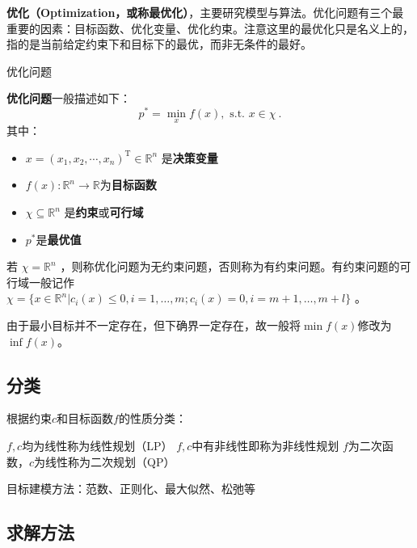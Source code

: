 
\begin{issues}
\issueDraft
\end{issues}


\textbf{优化（Optimization，或称最优化）}，主要研究模型与算法。优化问题有三个最重要的因素：目标函数、优化变量、优化约束。注意这里的最优化只是名义上的，指的是当前给定约束下和目标下的最优，而非无条件的最好。

\begin{definition}{优化问题}

\textbf{优化问题}一般描述如下：
\begin{equation}
p^*=\min _x f(x),\text{ s.t. } x\in \chi ~.
\end{equation}
其中：
\begin{itemize}
\item $x=(x_1,x_2,\cdots,x_n)^\text{T}\in\mathbb{R}^n$ 是\textbf{决策变量}
\item $f(x):\mathbb{R}^n\rightarrow\mathbb{R}$为\textbf{目标函数}
\item $\chi\subseteq\mathbb{R}^n$ 是\textbf{约束}或\textbf{可行域}
\item $p^*$是\textbf{最优值}
\end{itemize}
\end{definition}

若 $\chi=\mathbb{R}^n$ ，则称优化问题为无约束问题，否则称为有约束问题。有约束问题的可行域一般记作$\chi=\{x\in \mathbb{R}^n|c_i(x)\le 0,i=1,\dots,m;c_i(x)=0,i=m+1,\dots,m+l\}$ 。

由于最小目标并不一定存在，但下确界一定存在，故一般将$\min f(x)$修改为$\inf f(x)$。

\subsection{分类}

根据约束$c$和目标函数$f$的性质分类：
\begin{itemize}
$f,c$均为线性称为线性规划（LP）
$f,c$中有非线性即称为非线性规划
$f$为二次函数，$c$为线性称为二次规划（QP）
\end{itemize}

目标建模方法：范数、正则化、最大似然、松弛等

\subsection{求解方法}

